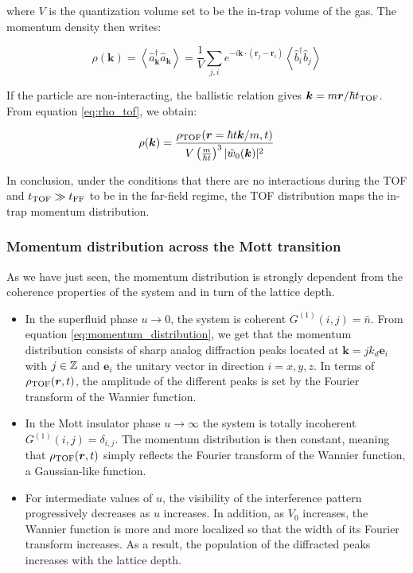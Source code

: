 \noindent where $V$ is the quantization volume set to be the in-trap volume of the gas. The momentum density then writes:

\begin{equation}
    \rho(\bm{k})=\left\langle\hat{a}^{\dagger}_{\bm{k}} \hat{a}_{\bm{k}}\right\rangle=\frac{1}{V} \sum_{j, i} e^{-i \bm{k} \cdot\left(\bm{r}_{j}-\bm{r}_{i}\right)}\left\langle\hat{b}_{i}^{\dagger} \hat{b}_{j}\right\rangle
    \label{eq:momentum_distribution}
\end{equation}

\noindent If the particle are non-interacting, the ballistic relation gives $\bm{k} = m \bm{r}/\hbar t_{\rm{TOF}}$. From equation \ref{eq:rho_tof}, we obtain:

\begin{equation}
    \rho(\bm{k}) = \frac{\rho_{\rm{TOF}}(\bm{r}=\hbar t\bm{k}/m,t)}{V  \left(\frac{m}{\hbar t} \right)^3 |\tilde{w}_0(\bm{k})|^2}
\end{equation}

In conclusion, under the conditions that there are no interactions during the TOF and $t_{\rm{TOF}} \gg t_{\rm{FF}}$ to be in the far-field regime, the TOF distribution maps the in-trap momentum distribution. 

\subsubsection{Momentum distribution across the Mott transition}

As we have just seen, the momentum distribution is strongly dependent from the coherence properties of the system and in turn of the lattice depth.

\begin{itemize}
    \item In the superfluid phase $u \to 0$, the system is coherent $G^{(1)}(i,j) = \bar{n}$. From equation \ref{eq:momentum_distribution}, we get that the momentum distribution consists of sharp analog diffraction peaks located at $\bm{k} = j k_d \bm{e}_i$ with $j \in \mathbb{Z}$ and $\bm{e}_i$ the unitary vector in direction $i=x,y,z$. In terms of $\rho_{\rm{TOF}}(\bm{r},t)$, the amplitude of the different peaks is set by the Fourier transform of the Wannier function. 
    
    \item In the Mott insulator phase $u \to \infty$ the system is totally incoherent $G^{(1)}(i,j) = \delta_{i,j}$. The momentum distribution is then constant, meaning that $\rho_{\rm{TOF}}(\bm{r},t)$ simply reflects the Fourier transform of the Wannier function, \ie a Gaussian-like function.
    
    \item For intermediate values of $u$, the visibility of the interference pattern progressively decreases as $u$ increases. In addition, as $V_0$ increases, the Wannier function is more and more localized so that the width of its Fourier transform increases. As a result, the population of the diffracted peaks increases with the lattice depth.
\end{itemize}

